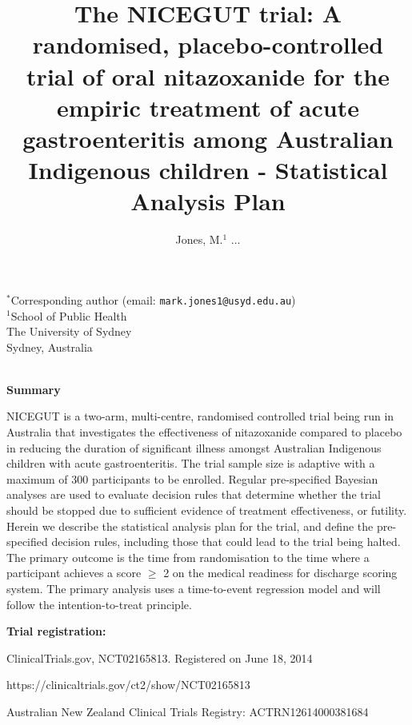 \documentclass[a4paper]{article}
\title{The NICEGUT trial: A randomised, placebo-controlled trial of oral nitazoxanide for the empiric treatment of acute gastroenteritis among Australian Indigenous children - Statistical Analysis Plan}
\author{Jones, M.$^{1}$ $\dots$}
\begin{document}
\maketitle



$^*$Corresponding author (email: \texttt{mark.jones1@usyd.edu.au}) \\
$^1$School of Public Health \\
The University of Sydney \\
Sydney, Australia \\
~ \\

\newcommand{\newbf}[1]{\mbox{\boldmath{$#1$}}}

\begin{center}\textbf{Summary}
\end{center}

NICEGUT is a two-arm, multi-centre, randomised controlled trial being run in Australia that investigates the effectiveness of nitazoxanide compared to placebo in reducing the duration of significant illness amongst Australian Indigenous children with acute gastroenteritis. 
The trial sample size is adaptive with a maximum of 300 participants to be enrolled.
Regular pre-specified Bayesian analyses are used to evaluate decision rules that determine whether the trial should be stopped due to sufficient evidence of treatment effectiveness, or futility. 
Herein we describe the statistical analysis plan for the trial, and define the pre-specified decision rules, including those that could lead to the trial being halted.
The primary outcome is the time from randomisation to the time where a participant achieves a score $\ge$ 2 on the medical readiness for discharge scoring system.
The primary analysis uses a time-to-event regression model and will follow the intention-to-treat principle.  



\clearpage

{\bf Trial registration:} 

\setlength{\leftskip}{1cm}ClinicalTrials.gov, NCT02165813. Registered on June 18, 2014

\setlength{\leftskip}{1cm}https://clinicaltrials.gov/ct2/show/NCT02165813

\setlength{\leftskip}{1cm}Australian New Zealand Clinical Trials Registry: ACTRN12614000381684
\end{document}
